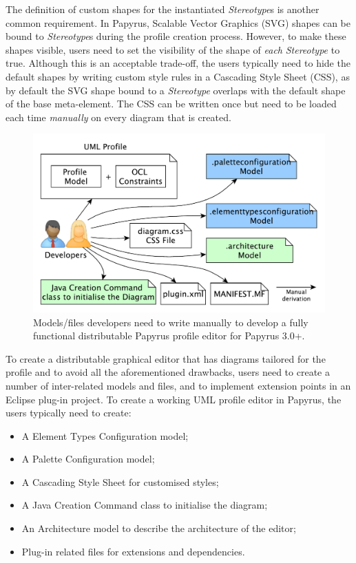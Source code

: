 The definition of custom shapes for the instantiated \textit{Stereotype}s is another common requirement. 
In Papyrus, Scalable Vector Graphics (SVG) shapes can be bound to \textit{Stereotype}s during the profile creation process. 
However, to make these shapes visible, users need to set the visibility of the shape of \textit{each} \textit{Stereotype} to true. 
Although this is an acceptable trade-off, the users typically need to hide the default shapes by writing custom style rules in a Cascading Style Sheet (CSS), as by default the SVG shape bound to a \textit{Stereotype} overlaps with the default shape of the base meta-element.
The CSS can be written once but need to be loaded each time \textit{manually} on every diagram that is created. 

\begin{figure}[ht!]
	\centering
	\includegraphics[width=1\textwidth]{diagrams/neededPapyrusFiles_new.pdf}
	\vspace{-3mm}
	\caption[]{Models/files developers need to write manually to 
		develop a fully functional distributable Papyrus profile editor for Papyrus 3.0+.}
	\label{fig:neededPapyrusFiles_new}
\end{figure}

To create a distributable graphical editor that has diagrams tailored for the profile and to avoid all the aforementioned drawbacks, users need to create a number of inter-related models and files, and to implement extension points in an Eclipse plug-in project. 
To create a working UML profile editor in Papyrus, the users typically need to create:
\begin{itemize}
	\item A Element Types Configuration model;
	\item A Palette Configuration model;
	\item A Cascading Style Sheet for customised styles;
	\item A Java Creation Command class to initialise the diagram;
	\item An Architecture model to describe the architecture of the editor;
	\item Plug-in related files for extensions and dependencies.
\end{itemize}

